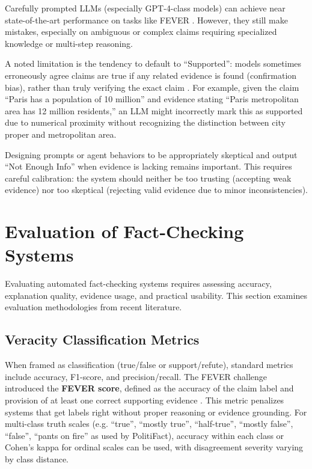 \documentclass[12pt,a4paper]{article}
\begin{document}
Carefully prompted LLMs (especially GPT-4-class models) can achieve near state-of-the-art performance on tasks like FEVER \citep{thorne2018fever}. However, they still make mistakes, especially on ambiguous or complex claims requiring specialized knowledge or multi-step reasoning.

A noted limitation is the tendency to default to ``Supported'': models sometimes erroneously agree claims are true if any related evidence is found (confirmation bias), rather than truly verifying the exact claim \citep{zhang2023siren}. For example, given the claim ``Paris has a population of 10 million'' and evidence stating ``Paris metropolitan area has 12 million residents,'' an LLM might incorrectly mark this as supported due to numerical proximity without recognizing the distinction between city proper and metropolitan area.

Designing prompts or agent behaviors to be appropriately skeptical and output ``Not Enough Info'' when evidence is lacking remains important. This requires careful calibration: the system should neither be too trusting (accepting weak evidence) nor too skeptical (rejecting valid evidence due to minor inconsistencies).

\section{Evaluation of Fact-Checking Systems}

Evaluating automated fact-checking systems requires assessing accuracy, explanation quality, evidence usage, and practical usability. This section examines evaluation methodologies from recent literature.

\subsection{Veracity Classification Metrics}

When framed as classification (true/false or support/refute), standard metrics include accuracy, F1-score, and precision/recall. The FEVER challenge introduced the \textbf{FEVER score}, defined as the accuracy of the claim label and provision of at least one correct supporting evidence \citep{thorne2018fever}. This metric penalizes systems that get labels right without proper reasoning or evidence grounding. For multi-class truth scales (e.g. ``true'', ``mostly true'', ``half-true'', ``mostly false'', ``false'', ``pants on fire'' as used by PolitiFact), accuracy within each class or Cohen's kappa for ordinal scales can be used, with disagreement severity varying by class distance.
\end{document}
